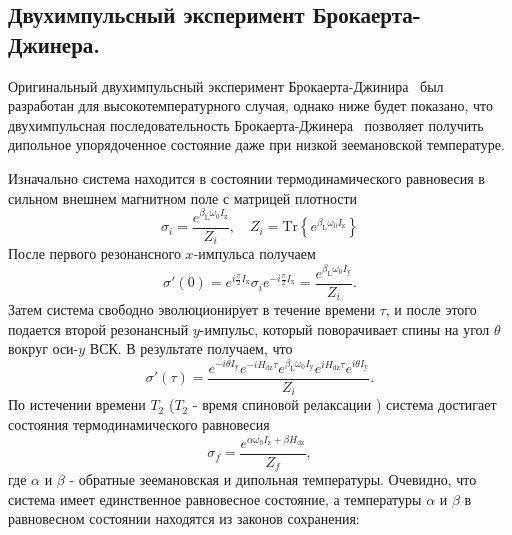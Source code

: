 \subsection{Двухимпульсный эксперимент Брокаерта-Джинера.}
\label{seq:jeener-sequence}

Оригинальный двухимпульсный эксперимент Брокаерта-Джинира~\cite{Jeener1967} был разработан  для высокотемпературного случая,
однако ниже будет показано,
что двухимпульсная последовательность Брокаерта-Джинера~\cite{Goldman1970,Jeener1967}
позволяет получить дипольное упорядоченное состояние
даже при низкой зеемановской температуре.

Изначально система находится в состоянии термодинамического равновесия в сильном внешнем магнитном поле с матрицей плотности
%
\begin{equation}
  \label{eq:a1}
  \sigma_{i} = \dfrac{e^{\beta_\mathrm{L} \omega_{0} I_\mathrm{z}}}{Z_{i}} ,
  \quad
  Z_{i} = \mathrm{Tr}\left\{e^{\beta_\mathrm{L} \omega_{0} I_\mathrm{z}} \right\}
\end{equation}
%
После первого резонансного $x$-импульса получаем
%
\begin{equation}
  \label{eq:a2}
  \sigma'(0) = e^{ i \frac \pi 2 I_\mathrm{x}}
  \sigma_{i}
  e^{-i \frac \pi 2 I_\mathrm{x}}
  = \dfrac{e^{\beta_\mathrm{L} \omega_{0} I_\mathrm{y}}}{Z_{i}} .
\end{equation}
%
Затем система свободно эволюционирует в течение времени $\tau$,
и после этого подается второй резонансный $y$-импульс, который поворачивает спины на угол $\theta$ вокруг оси-$y$ ВСК.
В результате получаем, что
\begin{equation}
  \label{eq:a3}
  \sigma'(\tau)
  = \dfrac{
   e^{-i \theta I_\mathrm{y}} e^{-i H_\mathrm{dz} \tau}
   e^{\beta_\mathrm{L} \omega_{0} I_\mathrm{y}}
   e^{i H_\mathrm{dz} \tau} e^{i \theta I_\mathrm{y}}
  }{Z_{i}}.
\end{equation}
%
По истечении времени $T_2$ ($T_2$ - время спиновой релаксации \cite{Goldman1970}) система достигает состояния термодинамического равновесия
\begin{equation}
  \label{eq:a4}
  \sigma_{f}
  = \dfrac{ e^{\alpha \omega_{0} I_\mathrm{z} + \beta H_\mathrm{dz}} }{Z_f},
\end{equation}
%
где $\alpha$ и $\beta$ - обратные зеемановская и дипольная температуры.
Очевидно, что система имеет единственное  равновесное состояние, а
 температуры $\alpha$ и $\beta$ в равновесном состоянии находятся из
законов сохранения:

